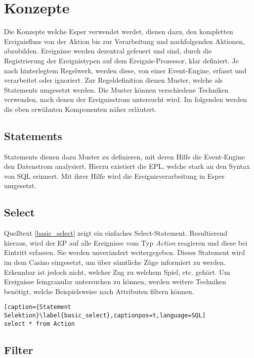 \chapter{Konzepte}
Die Konzepte welche Esper verwendet werdet, dienen dazu, den kompletten Ereignisfluss von der Aktion bis zur Verarbeitung und nachfolgenden Aktionen, abzubilden.
Ereignisse werden dezentral gefeuert und sind, durch die Registrierung der Ereignistypen auf dem Ereignis-Prozessor, klar definiert. Je nach hinterlegtem Regelwerk, werden diese, von einer Event-Engine, erfasst und verarbeitet oder ignoriert. Zur Regeldefinition dienen Muster, welche als Statements umgesetzt werden. Die Muster können verschiedene Techniken verwenden, nach denen der Ereignisstrom untersucht wird. Im folgenden werden die eben erwähnten Komponenten näher erläutert.

\section{Statements}

Statements dienen dazu Muster zu definieren, mit deren Hilfe die Event-Engine den Datenstrom analysiert. Hierzu existiert die \acf{EPL}, welche stark an den Syntax von SQL erinnert. Mit ihrer Hilfe wird die Ereignisverarbeitung in Esper umgesetzt.

\section{Select}

Quelltext \ref{basic_select} zeigt ein einfaches Select-Statement. Resultierend hieraus, wird der \acf{EP} auf alle Ereignisse vom Typ \textit{Action} reagieren und diese bei Eintritt erfassen. Sie werden unverändert weitergegeben. Dieses Statement wird im dem Casino eingesetzt, um über sämtliche Züge informiert zu werden. Erkennbar ist jedoch nicht, welcher Zug zu welchem Spiel, etc. gehört. Um Ereignisse feingranular untersuchen zu können, werden weitere Techniken benötigt, welche Beispielsweise nach Attributen filtern können.

\begin{lstlisting}[caption={Statement Selektion}\label{basic_select},captionpos=t,language=SQL]
select * from Action
\end{lstlisting}

\section{Filter}

